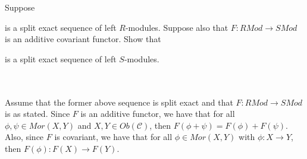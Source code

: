 Suppose

\begin{center}
\end{center}

is a split exact sequence of left $R$-modules. Suppose also that $F:RMod\to SMod$ is an additive
covariant functor. Show that

\begin{center}
\end{center}

is a split exact sequence of left $S$-modules.\\\\

\begin{solution}\renewcommand{\qedsymbol}{}\ \\
     Assume that the former above sequence is split exact and that $F:RMod\to SMod$ is as stated. Since
     $F$ is an additive functor, we have that for all $\phi,\psi\in Mor(X,Y)$ and
     $X,Y\in Ob(\mathcal{C})$, then $F(\phi+\psi)=F(\phi)+F(\psi)$. Also, since $F$ is covariant, we
     have that for all $\phi\in Mor(X,Y)$ with $\phi:X\to Y$, then $F(\phi):F(X)\to F(Y)$.

\end{solution}
